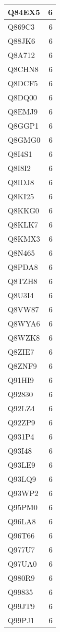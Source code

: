 \documentclass[
]{book}
\theoremstyle{definition}
\theoremstyle{definition}
\theoremstyle{definition}
\theoremstyle{definition}
\theoremstyle{remark}
\begin{document}
\begin{table}
\begin{tabular}{l|r}
\hline
Q84EX5 & 6\\
\hline
Q869C3 & 6\\
\hline
Q88JK6 & 6\\
\hline
Q8A712 & 6\\
\hline
Q8CHN8 & 6\\
\hline
Q8DCF5 & 6\\
\hline
Q8DQ00 & 6\\
\hline
Q8EMJ9 & 6\\
\hline
Q8GGP1 & 6\\
\hline
Q8GMG0 & 6\\
\hline
Q8I4S1 & 6\\
\hline
Q8I8I2 & 6\\
\hline
Q8IDJ8 & 6\\
\hline
Q8KI25 & 6\\
\hline
Q8KKG0 & 6\\
\hline
Q8KLK7 & 6\\
\hline
Q8KMX3 & 6\\
\hline
Q8N465 & 6\\
\hline
Q8PDA8 & 6\\
\hline
Q8TZH8 & 6\\
\hline
Q8U3I4 & 6\\
\hline
Q8VW87 & 6\\
\hline
Q8WYA6 & 6\\
\hline
Q8WZK8 & 6\\
\hline
Q8ZIE7 & 6\\
\hline
Q8ZNF9 & 6\\
\hline
Q91HI9 & 6\\
\hline
Q92830 & 6\\
\hline
Q92LZ4 & 6\\
\hline
Q92ZP9 & 6\\
\hline
Q931P4 & 6\\
\hline
Q93I48 & 6\\
\hline
Q93LE9 & 6\\
\hline
Q93LQ9 & 6\\
\hline
Q93WP2 & 6\\
\hline
Q95PM0 & 6\\
\hline
Q96LA8 & 6\\
\hline
Q96T66 & 6\\
\hline
Q977U7 & 6\\
\hline
Q97UA0 & 6\\
\hline
Q980R9 & 6\\
\hline
Q99835 & 6\\
\hline
Q99JT9 & 6\\
\hline
Q99PJ1 & 6\\

\end{tabular}
\end{table}
\end{document}
